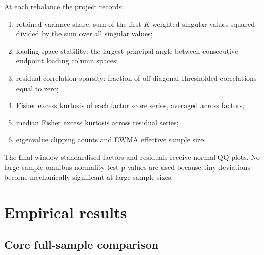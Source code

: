\documentclass[11pt,a4paper]{article}
\begin{document}
At each rebalance the project records:
\begin{enumerate}
  \item retained variance share: sum of the first $K$ weighted singular values squared divided by the sum over all singular values;
  \item loading-space stability: the largest principal angle between consecutive endpoint loading column spaces;
  \item residual-correlation sparsity: fraction of off-diagonal thresholded correlations equal to zero;
  \item Fisher excess kurtosis of each factor score series, averaged across factors;
  \item median Fisher excess kurtosis across residual series;
  \item eigenvalue clipping counts and EWMA effective sample size.
\end{enumerate}
The final-window standardised factors and residuals receive normal QQ plots. No large-sample omnibus normality-test p-values are used because tiny deviations become mechanically significant at large sample sizes.

\section{Empirical results}

\subsection{Core full-sample comparison}

\begin{table}[H]
\centering
\caption{Core NIFTY results, February 2017--August 2026}
\label{tab:core-results}
\end{table}
\end{document}
